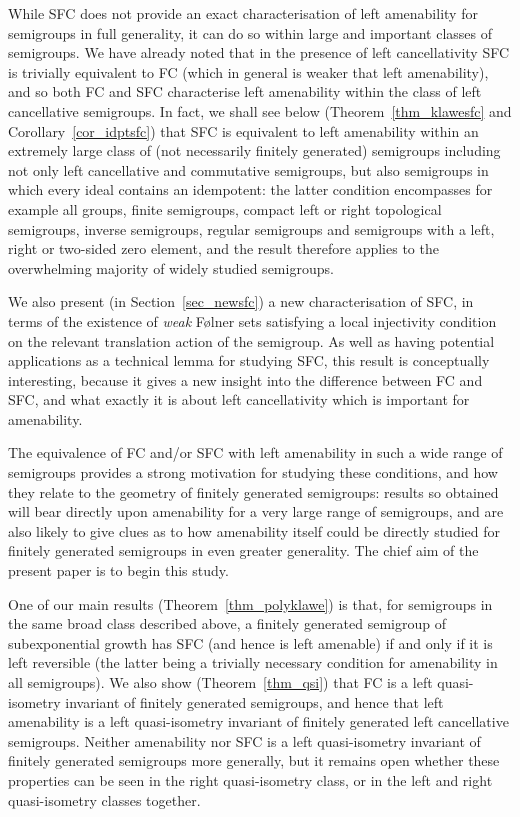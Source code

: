 \documentclass[11pt,a4paper,reqno]{amsart}
\begin{document}
While SFC does not provide an exact characterisation of left amenability
for semigroups in full generality, it can do so within large and important
classes of semigroups. We have already noted that in the presence of left
cancellativity SFC is trivially equivalent to FC (which in general is weaker
that left amenability), and so both FC and SFC characterise left amenability
within the class of left cancellative semigroups. In fact, we shall see below
(Theorem~\ref{thm_klawesfc} and Corollary~\ref{cor_idptsfc}) that SFC is
equivalent to left amenability within
an extremely large class of (not necessarily finitely generated) semigroups including not only left cancellative and commutative semigroups, but 
also semigroups in which every ideal contains an idempotent: the latter
condition encompasses
for example all groups, finite semigroups, compact left or right topological semigroups, inverse semigroups, regular semigroups and semigroups with a left, right or two-sided zero element, and the result therefore
applies to the overwhelming majority of widely studied semigroups.

We also present (in Section~\ref{sec_newsfc})  a new characterisation of SFC, in terms of the existence of \textit{weak} F\o lner sets satisfying a local injectivity condition on the relevant translation action of the semigroup. As well as having potential applications
as a technical lemma for studying SFC, this result is conceptually interesting,
because it gives a new insight
into the difference between FC and SFC, and what exactly it is about
left cancellativity which is important for amenability.

The equivalence of FC and/or SFC with left amenability in such a wide range of semigroups provides
a strong motivation for studying these conditions, and how they
relate to the geometry of finitely generated semigroups: results so obtained will bear directly upon amenability for a very large range of semigroups, and are also likely to give clues as to how amenability itself could be directly studied for finitely generated semigroups in even greater generality. The chief aim of the present paper is to begin this study.

One of our main results (Theorem~\ref{thm_polyklawe}) is that, for semigroups in the same broad class described
above, a finitely generated semigroup of subexponential growth has SFC (and hence is left amenable) if and only if it is left reversible (the latter being a trivially necessary condition for amenability in all semigroups).
We also show (Theorem~\ref{thm_qsi}) that FC is a left quasi-isometry
invariant of finitely generated semigroups, and hence that left amenability
is a left quasi-isometry invariant of finitely generated left cancellative
semigroups. Neither amenability nor SFC is a left quasi-isometry invariant
of finitely generated semigroups more generally, but it remains open whether
these properties can be seen in the right quasi-isometry class, or in the
left and right quasi-isometry classes together.
\end{document}
